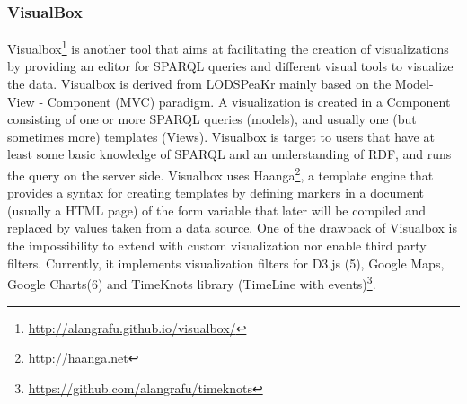 
\subsubsection{VisualBox}

Visualbox\footnote{\url{http://alangrafu.github.io/visualbox/}} is another tool that aims at facilitating the creation of visualizations by providing an editor for SPARQL queries and different 
visual tools to visualize the data. Visualbox is derived from LODSPeaKr \cite{graves13} mainly based on the Model- View - Component (MVC) paradigm. A visualization is created in a Component consisting of one or more SPARQL queries (models), and usually one (but sometimes more) templates (Views).
Visualbox is target to users that have at least some basic knowledge of SPARQL and an understanding of RDF, and runs the query on the server side. Visualbox uses Haanga\footnote{\url{http://haanga.net}}, a template engine that provides a syntax for creating templates by defining markers in a document (usually a HTML page) of the form {{variable}} that later will be compiled and replaced by values taken from a data source. One of the drawback of Visualbox is the impossibility to extend with custom visualization nor enable third party filters.
Currently, it implements visualization filters for D3.js (5), Google Maps, Google Charts(6) and TimeKnots library (TimeLine with events)\footnote{\url{https://github.com/alangrafu/timeknots}}.

